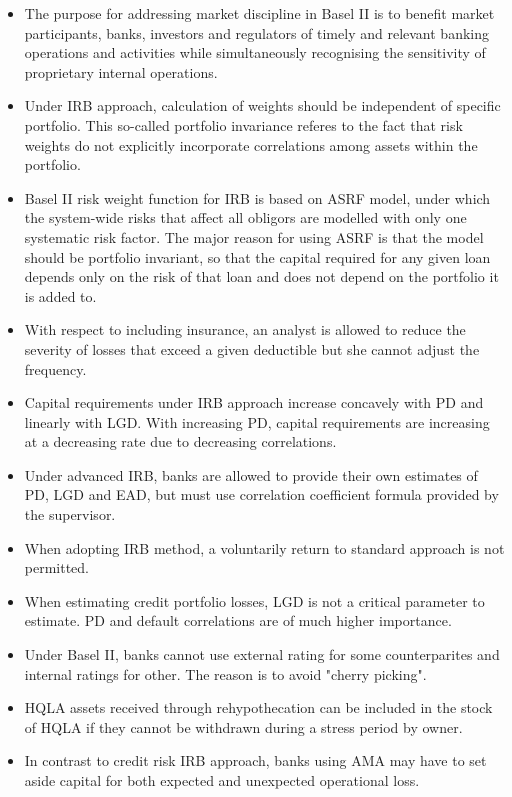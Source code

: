 \begin{itemize}
	\item The purpose for addressing market discipline in Basel II is to benefit market participants, banks, investors and regulators of timely and relevant banking operations and activities while simultaneously recognising the sensitivity of proprietary internal operations.
	\item Under IRB approach, calculation of weights should be independent of specific portfolio. This so-called portfolio invariance referes to the fact that risk weights do not explicitly incorporate correlations among assets within the portfolio.
	\item Basel II risk weight function for IRB is based on ASRF model, under which the system-wide risks that affect all 
	obligors are modelled with only one systematic risk factor. The major reason for using ASRF is that the model should be portfolio invariant, so that the capital required for any given loan depends only on the risk of that loan and does not depend on the portfolio it is added to.
	\item With respect to including insurance, an analyst is allowed to reduce the severity of losses that exceed a given deductible but she cannot adjust the frequency.
	\item Capital requirements under IRB approach increase concavely with PD and linearly with LGD. With increasing PD, capital requirements are increasing at a decreasing rate due to decreasing correlations.
	\item Under advanced IRB, banks are allowed to provide their own estimates of PD, LGD and EAD, but must use correlation coefficient formula provided by the supervisor.
	\item When adopting IRB method, a voluntarily return to standard approach is not permitted.
	\item When estimating credit portfolio losses, LGD is not a critical parameter to estimate. PD and default correlations are of much higher importance.
	\item Under Basel II, banks cannot use external rating for some counterparites and internal ratings for other. The reason is to avoid "cherry picking".
	\item HQLA assets received through rehypothecation can be included in the stock of HQLA if they cannot be withdrawn during a stress period by owner.
	\item In contrast to credit risk IRB approach, banks using AMA may have to set aside capital for both expected and unexpected operational loss.
\end{itemize}


